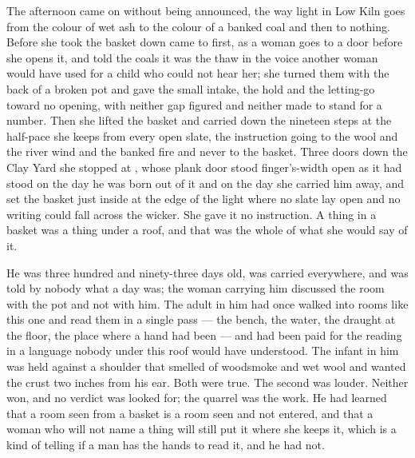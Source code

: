 \scenebreak

The afternoon came on without being announced, the way light in Low Kiln goes from the colour of wet ash to the colour of a banked coal and then to nothing. Before she took the basket down  came to  first, as a woman goes to a door before she opens it, and told the coals it was the thaw in the voice another woman would have used for a child who could not hear her; she turned them with the back of a broken pot and gave the small intake, the hold and the letting-go toward no opening, with neither gap figured and neither made to stand for a number. Then she lifted the basket and carried  down the nineteen steps at the half-pace she keeps from every open slate, the instruction going to the wool and the river wind and the banked fire and never to the basket. Three doors down the Clay Yard she stopped at , whose plank door stood finger's-width open as it had stood on the day he was born out of it and on the day she carried him away, and set the basket just inside  at the edge of the light where no slate lay open and no writing could fall across the wicker. She gave it no instruction. A thing in a basket was a thing under a roof, and that was the whole of what she would say of it.

He was three hundred and ninety-three days old, was carried everywhere, and was told by nobody what a day was; the woman carrying him discussed the room with the pot and not with him. The adult in him had once walked into rooms like this one and read them in a single pass --- the bench, the water, the draught at the floor, the place where a hand had been --- and had been paid for the reading in a language nobody under this roof would have understood. The infant in him was held against a shoulder that smelled of woodsmoke and wet wool and wanted the crust two inches from his ear. Both were true. The second was louder. Neither won, and no verdict was looked for; the quarrel was the work. He had learned that a room seen from a basket is a room seen and not entered, and that a woman who will not name a thing will still put it where she keeps it, which is a kind of telling if a man has the hands to read it, and he had not.

